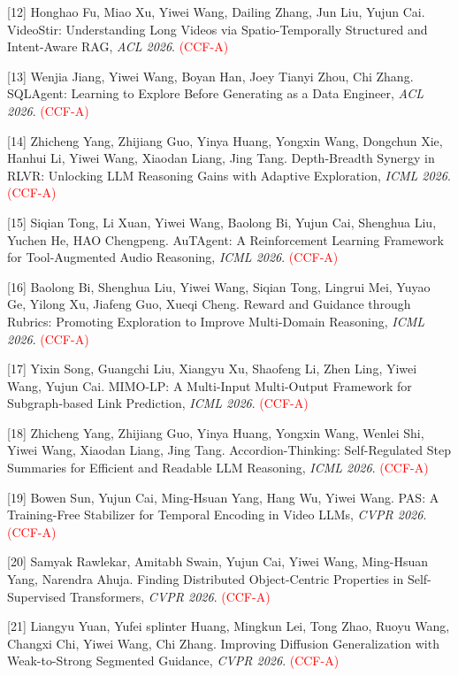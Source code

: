 [12] Honghao Fu, Miao Xu, Yiwei Wang, Dailing Zhang, Jun Liu, Yujun Cai. VideoStir: Understanding Long Videos via Spatio-Temporally Structured and Intent-Aware RAG, \textit{ACL 2026}. \textcolor{red}{(CCF-A)}

[13] Wenjia Jiang, Yiwei Wang, Boyan Han, Joey Tianyi Zhou, Chi Zhang. SQLAgent: Learning to Explore Before Generating as a Data Engineer, \textit{ACL 2026}. \textcolor{red}{(CCF-A)}

[14] Zhicheng Yang, Zhijiang Guo, Yinya Huang, Yongxin Wang, Dongchun Xie, Hanhui Li, Yiwei Wang, Xiaodan Liang, Jing Tang. Depth-Breadth Synergy in RLVR: Unlocking LLM Reasoning Gains with Adaptive Exploration, \textit{ICML 2026}. \textcolor{red}{(CCF-A)}

[15] Siqian Tong, Li Xuan, Yiwei Wang, Baolong Bi, Yujun Cai, Shenghua Liu, Yuchen He, HAO Chengpeng. AuTAgent: A Reinforcement Learning Framework for Tool-Augmented Audio Reasoning, \textit{ICML 2026}. \textcolor{red}{(CCF-A)}

[16] Baolong Bi, Shenghua Liu, Yiwei Wang, Siqian Tong, Lingrui Mei, Yuyao Ge, Yilong Xu, Jiafeng Guo, Xueqi Cheng. Reward and Guidance through Rubrics: Promoting Exploration to Improve Multi-Domain Reasoning, \textit{ICML 2026}. \textcolor{red}{(CCF-A)}

[17] Yixin Song, Guangchi Liu, Xiangyu Xu, Shaofeng Li, Zhen Ling, Yiwei Wang, Yujun Cai. MIMO-LP: A Multi-Input Multi-Output Framework for Subgraph-based Link Prediction, \textit{ICML 2026}. \textcolor{red}{(CCF-A)}

[18] Zhicheng Yang, Zhijiang Guo, Yinya Huang, Yongxin Wang, Wenlei Shi, Yiwei Wang, Xiaodan Liang, Jing Tang. Accordion-Thinking: Self-Regulated Step Summaries for Efficient and Readable LLM Reasoning, \textit{ICML 2026}. \textcolor{red}{(CCF-A)}

[19] Bowen Sun, Yujun Cai, Ming-Hsuan Yang, Hang Wu, Yiwei Wang. PAS: A Training-Free Stabilizer for Temporal Encoding in Video LLMs, \textit{CVPR 2026}. \textcolor{red}{(CCF-A)}

[20] Samyak Rawlekar, Amitabh Swain, Yujun Cai, Yiwei Wang, Ming-Hsuan Yang, Narendra Ahuja. Finding Distributed Object-Centric Properties in Self-Supervised Transformers, \textit{CVPR 2026}. \textcolor{red}{(CCF-A)}

[21] Liangyu Yuan, Yufei splinter Huang, Mingkun Lei, Tong Zhao, Ruoyu Wang, Changxi Chi, Yiwei Wang, Chi Zhang. Improving Diffusion Generalization with Weak-to-Strong Segmented Guidance, \textit{CVPR 2026}. \textcolor{red}{(CCF-A)}

